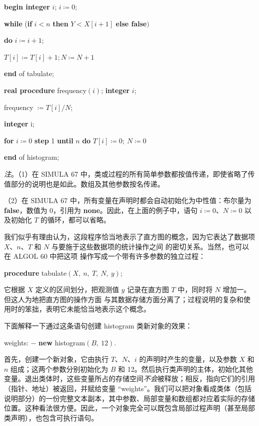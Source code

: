 \quad \quad \quad \quad \textbf{begin integer} $i$; $i\coloneq 0$;

\quad \quad \quad \quad \quad \textbf{while} (\textbf{if} $i < n$ \textbf{then} $Y < X[i + 1]$ \textbf{else false}$)$

\quad \quad \quad \quad \quad \quad \textbf{do} $i\coloneq i + 1$;

\quad \quad \quad \quad \quad $T[i] \coloneq T[i] + 1; N\coloneq N + 1$

\quad \quad \quad \quad \textbf{end} of tabulate;

\quad \quad \quad \textbf{real procedure} frequency$(i)$; \textbf{integer} $i$;

\quad \quad \quad \quad frequency $\coloneq T[i]/N$;

\quad \quad \quad \textbf{integer} i;

\quad \quad \quad \textbf{for} $i\coloneq 0$ \textbf{step} 1 \textbf{until} $n$ \textbf{do} $T[i]\coloneq 0;\ N\coloneq 0$

\quad \textbf{end} of histogram;

\textit{注}。（1）在 SIMULA 67 中，类或过程的所有简单参数都按值传递，即使省略了传值部分的说明也是如此。数组及其他参数按名传递。

（2）在 SIMULA 67 中，所有变量在声明时都会自动初始化为中性值：布尔量为 \textbf{false}，数值为 0，引用为 \textbf{none}。因此，在上面的例子中，语句 $i\coloneq 0$、$N\coloneq 0$ 以及初始化 $T$ 的循环，都可以省略。

我们似乎有理由认为，这段程序恰当地表示了直方图的概念，因为它表达了数据项 $X$、$n$、$T$ 和 $N$ 与要施于这些数据项的统计操作之间
的密切关系。当然，也可以在 ALGOL 60 中把这项
操作写成一个带有许多参数的独立过程：

\quad \textbf{procedure} tabulate$(X,\ n,\ T,\ N,\ y)$;

\noindent
它根据 $X$ 定义的区间划分，把观测值 $y$ 记录在直方图 $T$ 中，同时将 $N$ 增加一。但这人为地把直方图的操作方面
与其数据存储方面分离了；过程说明的复杂和使用时的笨拙，表明它未能恰当地表示这个概念。

下面解释一下通过这条语句创建 histogram 类新对象的效果：

\quad weights: $-$ \textbf{new} histogram$(B,\ 12)$.

\noindent
首先，创建一个新对象，它由执行 $T$、$N$、$i$ 的声明时产生的变量，以及参数 $X$ 和 $n$ 组成；这两个参数分别初始化为 $B$ 和 12。然后执行类声明的主体，初始化其他变量。退出类体时，这些变量所占的存储空间\textit{不会}被释放；相反，指向它们的引用（指针、地址）被返回，并赋给变量 ``weights''。我们可以把对象看成类体（包括说明部分）的一份完整文本副本，其中参数、局部变量和数组都对应着实际的存储位置。这种看法很方便。因此，一个对象完全可以既包含局部过程声明（甚至局部类声明），也包含可执行语句。

